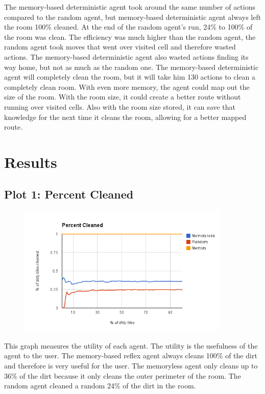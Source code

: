 \documentclass[a4paper,10pt]{article}
\begin{document}
The memory-based deterministic agent took around the same number of actions compared to the random agent, but memory-based deterministic agent always left the room 100\% cleaned.
At the end of the random agent's run, 24\% to 100\% of the room was clean.
The efficiency was much higher than the random agent, the random agent took moves that went over visited cell and therefore wasted actions.
The memory-based deterministic agent also wasted actions finding its way home, but not as much as the random one.
The memory-based deterministic agent will completely clean the room, but it will take him 130 actions to clean a completely clean room.
With even more memory, the agent could map out the size of the room.
With the room size, it could create a better route without running over visited cells.
Also with the room size stored, it can save that knowledge for the next time it cleans the room, allowing for a better mapped route.


\section{Results}
\subsection{Plot 1: Percent Cleaned}
\begin{figure}[H]
	\begin{center}
		\includegraphics[width=0.9\textwidth]{image.png}
	\end{center}
\end{figure}
This graph measures the utility of each agent.
The utility is the usefulness of the agent to the user. 
The memory-based reflex agent always cleans 100\% of the dirt and therefore is very useful for the user.
The memoryless agent only cleans up to 36\% of the dirt because it only cleans the outer perimeter of the room.
The random agent cleaned a random 24\% of the dirt in the room. 
\end{document}
